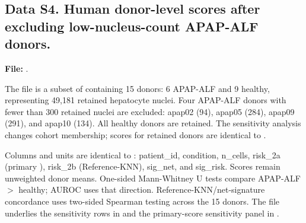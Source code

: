 \subsection*{Data S4. Human donor-level scores after excluding low-nucleus-count APAP-ALF donors.}
\label{data:S4}
\noindent\textbf{File:} .\par\smallskip
\noindent The file is a subset of  containing 15 donors: 6 APAP-ALF and 9 healthy, representing 49,181 retained hepatocyte nuclei. Four APAP-ALF donors with fewer than 300 retained nuclei are excluded: apap02 (94), apap05 (284), apap09 (291), and apap10 (134). All healthy donors are retained. The sensitivity analysis changes cohort membership; scores for retained donors are identical to .\par\smallskip
\noindent Columns and units are identical to : patient\_id, condition, n\_cells, risk\_2a (primary \SelfOnly{}), risk\_2b (Reference-KNN), sig\_net, and sig\_risk. Scores remain unweighted donor means. One-sided Mann-Whitney U tests compare APAP-ALF \(>\) healthy; AUROC uses that direction. Reference-KNN/net-signature concordance uses two-sided Spearman testing across the 15 donors. The file underlies the sensitivity rows in  and the primary-score sensitivity panel in .\par\medskip

\clearpage
\Needspace{135pt}
